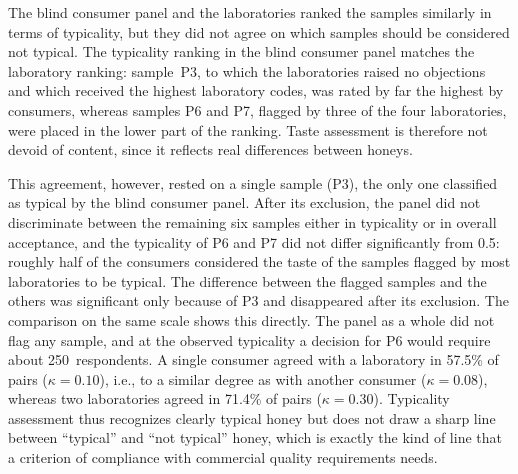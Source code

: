 

The blind consumer panel and the laboratories ranked the samples similarly in
terms of typicality, but they did not agree on which samples should be
considered not typical. The typicality ranking in the blind consumer panel
matches the laboratory ranking: sample~P3, to which the laboratories raised no
objections and which received the highest laboratory codes, was rated by far
the highest by consumers, whereas samples P6 and P7, flagged by three of the
four laboratories, were placed in the lower part of the ranking. Taste
assessment is therefore not devoid of content, since it reflects real
differences between honeys.

This agreement, however, rested on a single sample (P3), the only one
classified as typical by the blind consumer panel. After its exclusion, the
panel did not discriminate between the remaining six samples either in
typicality or in overall acceptance, and the typicality of P6 and P7 did not
differ significantly from 0.5: roughly half of the consumers considered the
taste of the samples flagged by most laboratories to be typical. The
difference between the flagged samples and the others was significant only
because of P3 and disappeared after its exclusion. The comparison on the same
scale shows this directly. The panel as a whole did not flag any sample, and
at the observed typicality a decision for P6 would require about
250~respondents. A single consumer agreed with a laboratory in 57.5\% of pairs
($\kappa = 0.10$), i.e., to a similar degree as with another consumer
($\kappa = 0.08$), whereas two laboratories agreed in 71.4\% of pairs
($\kappa = 0.30$). Typicality assessment thus recognizes clearly typical honey
but does not draw a sharp line between ``typical'' and ``not typical'' honey,
which is exactly the kind of line that a criterion of compliance with
commercial quality requirements needs.
